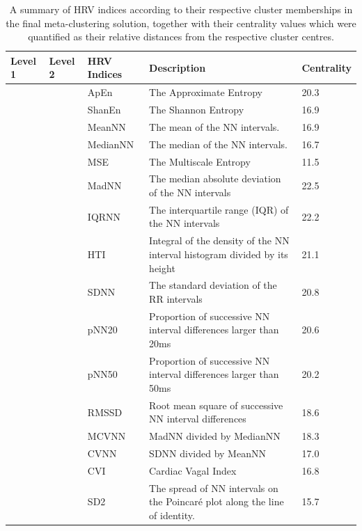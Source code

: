 \documentclass[
  english,
  jou,floatsintext]{apa6}
\begin{document}
\begin{table}[!h]

\caption{\label{tab:table1pdf}A summary of HRV indices according to their respective cluster memberships in the final meta-clustering solution, together with their centrality values which were quantified as their relative distances from the respective cluster centres.}
\centering
\fontsize{7}{9}\selectfont
\begin{tabular}[t]{>{\raggedright\arraybackslash}p{8em}>{\raggedright\arraybackslash}p{9em}lll}
\toprule
Level 1 & Level 2 & HRV Indices & Description & Centrality\\
\midrule
 &  & ApEn & The Approximate Entropy & 20.3\\
\cmidrule{3-5}
 &  & ShanEn & The Shannon Entropy & 16.9\\
\cmidrule{3-5}
 &  & MeanNN & The mean of the NN intervals. & 16.9\\
\cmidrule{3-5}
 &  & MedianNN & The median of the NN intervals. & 16.7\\
\cmidrule{3-5}
 & \multirow[t]{-5}{9em}{\raggedright\arraybackslash Centrality} & MSE & The Multiscale Entropy & 11.5\\
\cmidrule{2-5}
 &  & MadNN & The median absolute deviation of the NN intervals & 22.5\\
\cmidrule{3-5}
 &  & IQRNN & The interquartile range (IQR) of the NN intervals & 22.2\\
\cmidrule{3-5}
 &  & HTI & Integral of the density of the NN interval histogram divided by its height & 21.1\\
\cmidrule{3-5}
 &  & SDNN & The standard deviation of the RR intervals & 20.8\\
\cmidrule{3-5}
 &  & pNN20 & Proportion of successive NN interval differences larger than 20ms & 20.6\\
\cmidrule{3-5}
 &  & pNN50 & Proportion of successive NN interval differences larger than 50ms & 20.2\\
\cmidrule{3-5}
 &  & RMSSD & Root mean square of successive NN interval differences & 18.6\\
\cmidrule{3-5}
 &  & MCVNN & MadNN divided by MedianNN & 18.3\\
\cmidrule{3-5}
 &  & CVNN & SDNN divided by MeanNN & 17.0\\
\cmidrule{3-5}
 &  & CVI & Cardiac Vagal Index & 16.8\\
\cmidrule{3-5}
 &  & SD2 & The spread of NN intervals on the Poincaré plot along the line of identity. & 15.7\\

\end{tabular}
\end{table}
\end{document}
